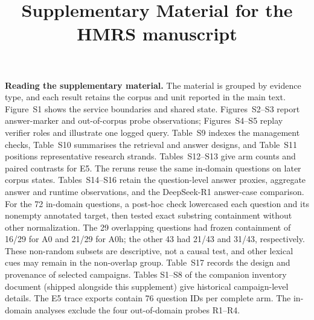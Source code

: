 \title{Supplementary Material for the HMRS manuscript}

\maketitle


\noindent\textbf{Reading the supplementary material.} The material is
grouped by evidence type, and each result retains the corpus and unit
reported in the main text. Figure~S1 shows the service boundaries and
shared state. Figures~S2--S3 report answer-marker and out-of-corpus probe
observations; Figures~S4--S5 replay verifier roles and illustrate one
logged query. Table~S9 indexes the management checks, Table~S10 summarises
the retrieval and answer designs, and Table~S11 positions representative
research strands. Tables~S12--S13 give arm counts and paired contrasts for
E5. The reruns reuse the same in-domain questions on later corpus states.
Tables~S14--S16 retain the
question-level answer proxies, aggregate answer and runtime observations,
and the DeepSeek-R1 answer-case comparison. For the 72 in-domain questions,
a post-hoc check lowercased each question and its nonempty annotated target,
then tested exact substring containment without other normalization. The
29 overlapping questions had frozen containment of 16/29 for A0 and 21/29
for A0h; the other 43 had 21/43 and 31/43, respectively. These non-random
subsets are descriptive, not a causal test, and other lexical cues may remain
in the non-overlap group. Table~S17 records the design and provenance of
selected campaigns. Tables S1--S8 of the companion inventory document
(shipped alongside this supplement) give historical campaign-level details.
The E5 trace exports contain 76 question IDs per complete arm. The in-domain
analyses exclude the four out-of-domain probes R1--R4.

